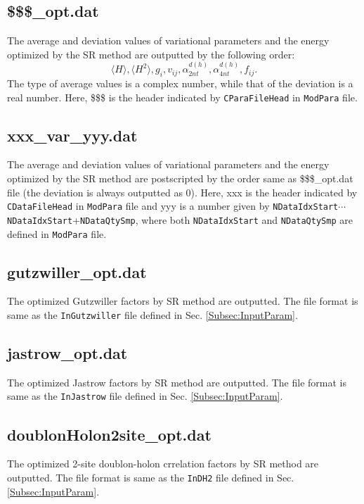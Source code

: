 \subsection{\$\$\$\_opt.dat}
The average and deviation values of variational parameters and the energy optimized by the SR method are outputted by the following order: 
\begin{equation}
\langle H \rangle, \langle H^2 \rangle, g_i, v_{ij}, \alpha_{2nt}^{d(h)}, \alpha_{4nt}^{d(h)}, f_{ij} \nonumber.
\end{equation}
The type of average values is a complex number, while that of the deviation is a real number.
Here, \$\$\$ is the header indicated by \verb|CParaFileHead| in \verb|ModPara| file.

\subsection{xxx\_var\_yyy.dat}
The average and deviation values of variational parameters and the energy optimized by the SR method are postscripted by the order same as \$\$\$\_opt.dat file (the deviation is always outputted as 0). 
Here, xxx is the header indicated by \verb|CDataFileHead| in \verb|ModPara| file and yyy is a number given by \verb|NDataIdxStart|$\cdots$\verb|NDataIdxStart|+\verb|NDataQtySmp|, where both \verb|NDataIdxStart| and \verb|NDataQtySmp| are defined in \verb|ModPara| file.

\subsection{gutzwiller\_opt.dat}
The optimized Gutzwiller factors by SR method are outputted. The file format is same as the \verb|InGutzwiller| file defined in Sec. \ref{Subsec:InputParam}.

\subsection{jastrow\_opt.dat}
The optimized Jastrow factors  by SR method are outputted. The file format is same as the \verb|InJastrow| file defined in Sec. \ref{Subsec:InputParam}.

\subsection{doublonHolon2site\_opt.dat}
The optimized 2-site doublon-holon crrelation factors  by SR method are outputted. The file format is same as the \verb|InDH2| file defined in Sec. \ref{Subsec:InputParam}.

